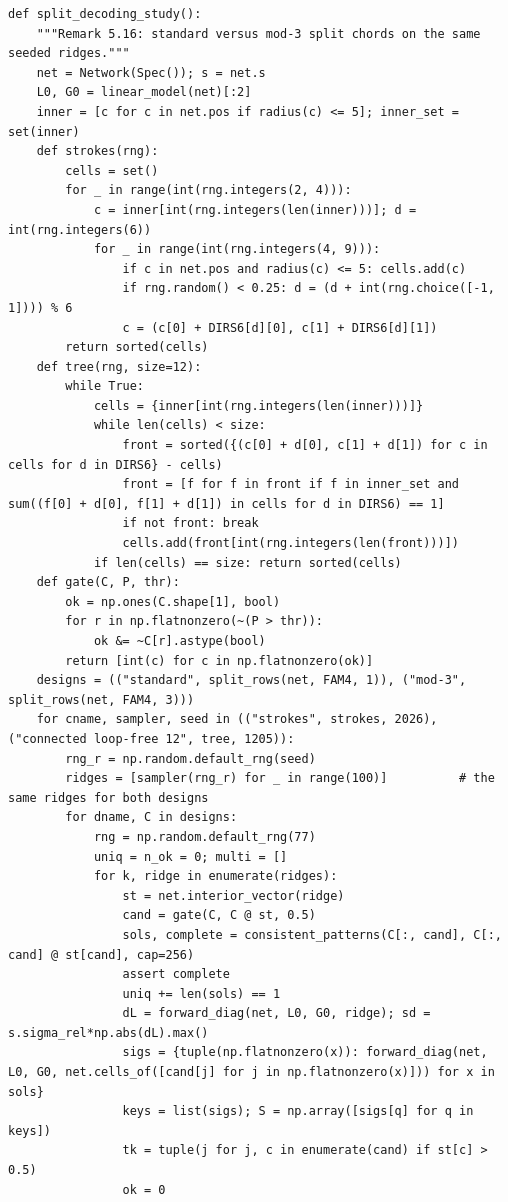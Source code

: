 \documentclass[11pt,a4paper]{article}
\theoremstyle{definition}
\theoremstyle{remark}
\begin{document}
\begin{lstlisting}
def split_decoding_study():
    """Remark 5.16: standard versus mod-3 split chords on the same seeded ridges."""
    net = Network(Spec()); s = net.s
    L0, G0 = linear_model(net)[:2]
    inner = [c for c in net.pos if radius(c) <= 5]; inner_set = set(inner)
    def strokes(rng):
        cells = set()
        for _ in range(int(rng.integers(2, 4))):
            c = inner[int(rng.integers(len(inner)))]; d = int(rng.integers(6))
            for _ in range(int(rng.integers(4, 9))):
                if c in net.pos and radius(c) <= 5: cells.add(c)
                if rng.random() < 0.25: d = (d + int(rng.choice([-1, 1]))) % 6
                c = (c[0] + DIRS6[d][0], c[1] + DIRS6[d][1])
        return sorted(cells)
    def tree(rng, size=12):
        while True:
            cells = {inner[int(rng.integers(len(inner)))]}
            while len(cells) < size:
                front = sorted({(c[0] + d[0], c[1] + d[1]) for c in cells for d in DIRS6} - cells)
                front = [f for f in front if f in inner_set and sum((f[0] + d[0], f[1] + d[1]) in cells for d in DIRS6) == 1]
                if not front: break
                cells.add(front[int(rng.integers(len(front)))])
            if len(cells) == size: return sorted(cells)
    def gate(C, P, thr):
        ok = np.ones(C.shape[1], bool)
        for r in np.flatnonzero(~(P > thr)):
            ok &= ~C[r].astype(bool)
        return [int(c) for c in np.flatnonzero(ok)]
    designs = (("standard", split_rows(net, FAM4, 1)), ("mod-3", split_rows(net, FAM4, 3)))
    for cname, sampler, seed in (("strokes", strokes, 2026), ("connected loop-free 12", tree, 1205)):
        rng_r = np.random.default_rng(seed)
        ridges = [sampler(rng_r) for _ in range(100)]          # the same ridges for both designs
        for dname, C in designs:
            rng = np.random.default_rng(77)
            uniq = n_ok = 0; multi = []
            for k, ridge in enumerate(ridges):
                st = net.interior_vector(ridge)
                cand = gate(C, C @ st, 0.5)
                sols, complete = consistent_patterns(C[:, cand], C[:, cand] @ st[cand], cap=256)
                assert complete
                uniq += len(sols) == 1
                dL = forward_diag(net, L0, G0, ridge); sd = s.sigma_rel*np.abs(dL).max()
                sigs = {tuple(np.flatnonzero(x)): forward_diag(net, L0, G0, net.cells_of([cand[j] for j in np.flatnonzero(x)])) for x in sols}
                keys = list(sigs); S = np.array([sigs[q] for q in keys])
                tk = tuple(j for j, c in enumerate(cand) if st[c] > 0.5)
                ok = 0

\end{lstlisting}
\end{document}
